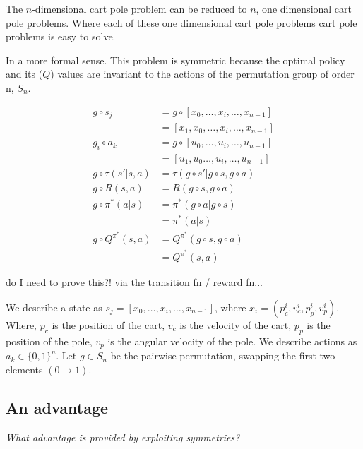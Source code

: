 The $n$-dimensional cart pole problem can be reduced to $n$, one dimensional cart pole problems.
Where each of these one dimensional cart pole problems cart pole problems is easy to solve.

In a more formal sense. This problem is symmetric because the optimal policy and its ($Q$) values are invariant to the actions of the permutation group of order n, $S_n$.

\begin{align*}
g \circ s_j &= g \circ [x_0, \dots, x_i, \dots, x_{n-1}] \\
&= [x_1, x_0, \dots, x_i, \dots, x_{n-1}] \\
g_i \circ a_k &= g \circ [u_0, \dots, u_i, \dots, u_{n-1}] \\
&= [u_1, u_0 \dots, u_i, \dots, u_{n-1}] \\
g\circ \tau(s'|s, a) &= \tau(g\circ s'|g\circ s, g\circ a) \\
g\circ R(s, a) &= R(g\circ s, g\circ a) \\
g\circ \pi^{* }(a|s) &= \pi^{* }(g\circ a| g\circ s) \\
&= \pi^{* }(a|s) \tag{invariance of the optimal policy}\\
g\circ Q^{\pi^{* }}(s, a) &= Q^{\pi^{* }}(g\circ s, g\circ a) \\
&= Q^{\pi^{* }}(s, a) \tag{invariance of the optimal values}
\end{align*}

{\color{red}do I need to prove this?! via the transition fn / reward fn...}

We describe a state as $s_j = [x_0, \dots, x_i, \dots, x_{n-1}]$, where $x_i = (p_c^i, v_c^i, p_p^i, v_p^i)$. Where, $p_c$ is the position of the cart, $v_c$ is the velocity of the cart, $p_p$ is the position of the pole, $v_p$ is the angular velocity of the pole. We describe actions as $a_k \in \{0, 1\}^n$. Let $g\in S_n$ be the pairwise permutation, swapping the first two elements $(0\to 1)$.



\subsection{An advantage}

\begin{displayquote}
\textit{What advantage is provided by exploiting symmetries?}
\end{displayquote}

